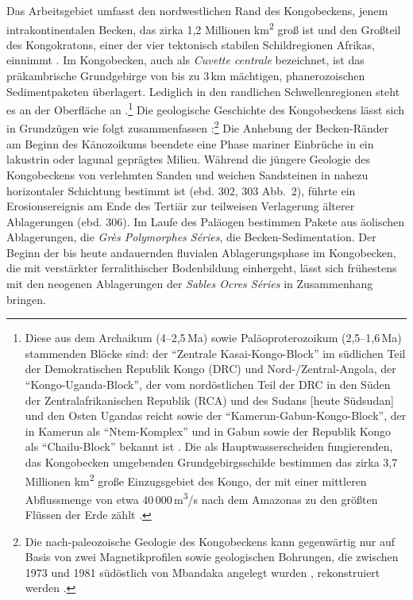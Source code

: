 \begin{multicols}{2}
Das Arbeitsgebiet umfasst den nordwestlichen Rand des Kongobeckens, jenem intrakontinentalen Becken, das zirka 1,2 Millionen km\textsuperscript{2} groß ist und den Großteil des Kongokratons, einer der vier tektonisch stabilen Schildregionen Afrikas, einnimmt \parencites[16]{Runge.2001}[240]{KadimaKabongo.2011}. Im Kongobecken, auch als \textit{Cuvette centrale} bezeichnet, ist das präkambrische Grundgebirge von bis zu 3\,km mächtigen, phanerozoischen Sedimentpaketen überlagert. Lediglich in den randlichen Schwellenregionen steht es an der Oberfläche an \parencite[17]{Runge.2001}.\footnote{Diese aus dem Archaikum (4--2,5\,Ma) sowie Paläoproterozoikum (2,5--1,6\,Ma) stammenden Blöcke sind: der \enquote{Zentrale Kasai-Kongo-Block} im südlichen Teil der Demokratischen Republik Kongo (DRC) und Nord-/Zentral-Angola, der \enquote{Kongo-Uganda-Block}, der vom nordöstlichen Teil der DRC in den Süden der Zentralafrikanischen Republik (RCA) und des Sudans [heute Südsudan] und den Osten Ugandas reicht sowie der \enquote{Kamerun-Gabun-Kongo-Block}, der in Kamerun als \enquote{Ntem-Komplex} und in Gabun sowie der Republik Kongo als \enquote{Chailu-Block} bekannt ist \parencite[240]{KadimaKabongo.2011}. Die als Hauptwasserscheiden fungierenden, das Kongobecken umgebenden Grundgebirgsschilde bestimmen das zirka 3,7 Millionen km\textsuperscript{2} große Einzugsgebiet des Kongo, der mit einer mittleren Abflussmenge von etwa 40\,000\,m\textsuperscript{3}/s nach dem Amazonas zu den größten Flüssen der Erde zählt \parencite[63]{Runge.2001}.}  Die geologische Geschichte des Kongobeckens lässt sich in Grundzügen wie folgt zusammenfassen \parencite[313]{Giresse.2005b}:\footnote{Die nach-paleozoische Geologie des Kongobeckens kann gegenwärtig nur auf Basis von zwei Magnetikprofilen sowie geologischen Bohrungen, die zwischen 1973 und 1981 südöstlich von Mbandaka angelegt wurden \parencites[siehe][]{Daly.1991}{Daly.1992}, rekonstruiert werden \parencite[301\,f.]{Giresse.2005b}.} Die Anhebung der Becken-Ränder am Beginn des Känozoikums beendete eine Phase mariner Einbrüche in ein lakustrin oder lagunal geprägtes Milieu. Während die jüngere Geologie des Kongobeckens von verlehmten Sanden und weichen Sandsteinen in nahezu horizontaler Schichtung bestimmt ist (ebd. 302, 303 Abb.~2), führte ein Erosionsereignis am Ende des Tertiär zur teilweisen Verlagerung älterer Ablagerungen (ebd. 306). Im Laufe des Paläogen bestimmen Pakete aus äolischen Ablagerungen, die \textit{Grès Polymorphes Séries}, die Becken-Sedimentation. Der Beginn der bis heute andauernden fluvialen Ablagerungsphase im Kongobecken, die mit verstärkter ferralithischer Bodenbildung einhergeht, lässt sich frühestens mit den neogenen Ablagerungen der \textit{Sables Ocres Séries} in Zusammenhang bringen. 


\end{multicols}
